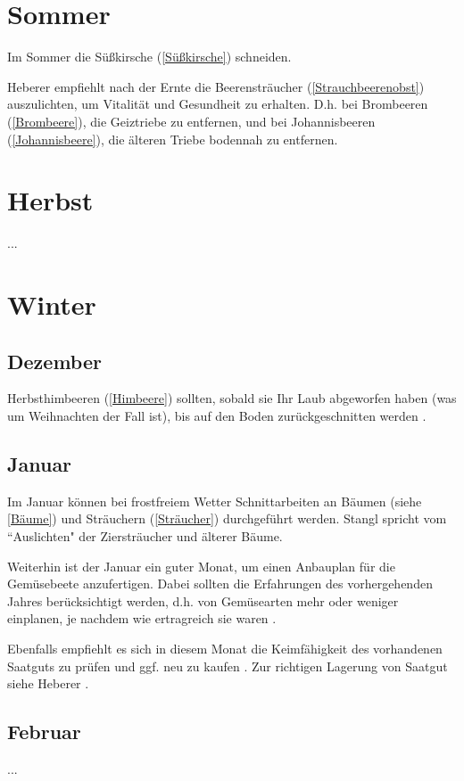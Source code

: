 \begin{partbacktext}
\section{Sommer}

Im Sommer die Süßkirsche (\ref{Süßkirsche}) schneiden.

Heberer \cite[S.~11]{Heberer2018} empfiehlt nach der Ernte die Beerensträucher (\ref{Strauchbeerenobst}) auszulichten, um Vitalität und Gesundheit zu erhalten.
D.h. bei Brombeeren (\ref{Brombeere}), die Geiztriebe zu entfernen, und bei Johannisbeeren (\ref{Johannisbeere}), die älteren Triebe bodennah zu entfernen.

\section{Herbst}

...

\pagebreak

\section{Winter}

\subsection{Dezember}

Herbsthimbeeren (\ref{Himbeere}) sollten, sobald sie Ihr Laub abgeworfen haben (was um Weihnachten der Fall ist), bis auf den Boden zurückgeschnitten werden \cite[S.~421]{Don2021}.

\subsection{Januar}

Im Januar können bei frostfreiem Wetter Schnittarbeiten an \textrightarrow Bäumen (siehe \ref{Bäume}) und \textrightarrow Sträuchern (\ref{Sträucher}) durchgeführt werden.
Stangl \cite[S.~256]{Stangl1995} spricht vom ``Auslichten" der Ziersträucher und älterer Bäume.

Weiterhin ist der Januar ein guter Monat, um einen Anbauplan für die Gemüsebeete anzufertigen.
Dabei sollten die Erfahrungen des vorhergehenden Jahres berücksichtigt werden, d.h. von Gemüsearten mehr oder weniger einplanen, je nachdem wie ertragreich sie waren \cite[S.~256]{Stangl1995}.

Ebenfalls empfiehlt es sich in diesem Monat die Keimfähigkeit des vorhandenen Saatguts zu prüfen und ggf. neu zu kaufen \cite[S.~216]{Heberer2018}.
Zur richtigen Lagerung von Saatgut siehe Heberer \cite[S.~179]{Heberer2018}.

\subsection{Februar}

...

\end{partbacktext}